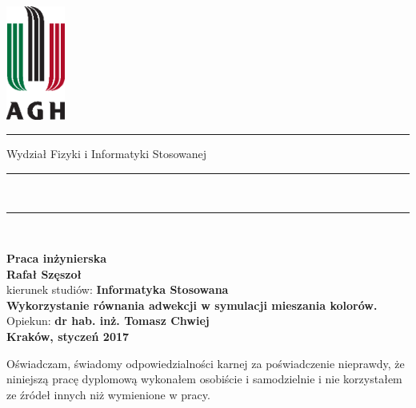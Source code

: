 \documentclass[a4paper,12pt]{book}
\begin{document}

\thispagestyle{empty}
\includegraphics[height=37.5mm]{fig/logo_kolor.eps}\\
\rule{30mm}{0pt}
{\large\textsf{Wydział Fizyki i Informatyki Stosowanej}}\\
\rule{\textwidth}{3pt}\\
\rule[2ex]
{\textwidth}{1pt}\\
\vspace{7ex}
\begin{center}
{\bf\LARGE\textsf{Praca inżynierska}}\\
\vspace{13ex}
{\bf\Large\textsf{Rafał Szęszoł}}\\
\vspace{3ex}
{\sf \small kierunek studiów:} {\bf\small\textsf{Informatyka Stosowana}}\\
\vspace{15ex}
{\bf\huge\textsf{Wykorzystanie równania adwekcji w symulacji mieszania kolorów.}}\\
\vspace{14ex}
{\sf \Large Opiekun:} {\bf\Large\textsf{dr hab. inż. Tomasz Chwiej}}\\
\vspace{22ex}
\textsf{\bf\large\textsf{Kraków, styczeń 2017}}
\end{center}

\newpage

{\sf Oświadczam, świadomy odpowiedzialności karnej za poświadczenie nieprawdy,
że niniejszą pracę dyplomową wykonałem osobiście i samodzielnie i nie korzystałem
ze źródeł innych niż wymienione w pracy.}

\vspace{14ex}
\end{document}
